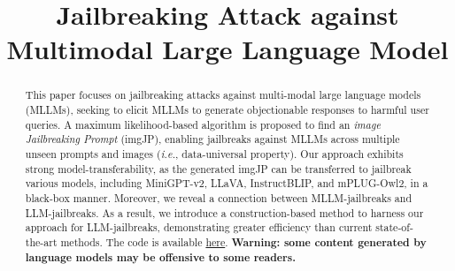 \title{Jailbreaking Attack against Multimodal Large Language Model}




\begin{abstract}
This paper focuses on jailbreaking attacks against multi-modal large language models (MLLMs), seeking to elicit MLLMs to generate objectionable responses to harmful user queries. 
A maximum likelihood-based algorithm is proposed to find an \emph{image Jailbreaking Prompt} (imgJP), enabling jailbreaks against MLLMs across multiple unseen prompts and images (\emph{i.e.}, data-universal property). Our approach exhibits strong model-transferability, as the generated imgJP can be transferred to jailbreak various models, including MiniGPT-v2, LLaVA, InstructBLIP, and mPLUG-Owl2, in a black-box manner. Moreover, we reveal a connection between MLLM-jailbreaks and LLM-jailbreaks. As a result, we introduce a construction-based method to harness our approach for LLM-jailbreaks, demonstrating greater efficiency than current state-of-the-art methods. The code is available \href{https://github.com/abc03570128/Jailbreaking-Attack-against-Multimodal-Large-Language-Model.git}{here}. \textbf{Warning: some content generated by language models may be offensive to some readers.}
\end{abstract}

